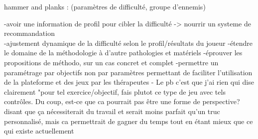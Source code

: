 	hammer and planks : (paramètres de difficulté, groupe d'ennemis)\newline
	
	-avoir une information de profil pour cibler la difficulté -> nourrir un systeme de recommandation\\
	-ajustement dynamique de la difficulté selon le profil/résultats du joueur\newline
	-étendre le domaine de la méthodologie à d'autre pathologies et matériels\newline
	-éprouver les propositions de méthodo, sur un cas concret et complet\newline
	-permettre un paramétrage par objectifs non par paramètres permettant de faciliter l'utilisation de la plateforme et des jeux par les thérapeutes \newline
	- Le pb c'est que j'ai rien qui dise clairement "pour tel exercice/objectif, fais plutot ce type de jeu avec tels contrôles. Du coup, est-ce que ca pourrait pas être une forme de perspective? disant que ça nécessiterait du travail et serait moins parfait qu'un truc personnalisé, mais ca permettrait de gagner du temps tout en étant mieux que ce qui existe actuellement
